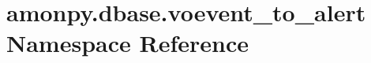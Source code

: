 \hypertarget{namespaceamonpy_1_1dbase_1_1voevent__to__alert}{\section{amonpy.\-dbase.\-voevent\-\_\-to\-\_\-alert Namespace Reference}
\label{namespaceamonpy_1_1dbase_1_1voevent__to__alert}
}
